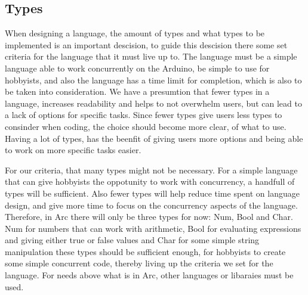 \subsection{Types}\label{sec:types}
When designing a language, the amount of types and what types to be implemented is an important descision, to guide this descision there some set criteria for the language that it must live up to. The language must be a simple language able to work concurrently on the Arduino, be simple to use for hobbyists, and also the language has a time limit for completion, which is also to be taken into consideration. We have a presumtion that fewer types in a language, increases readability and helps to not overwhelm users, but can lead to a lack of options for specific tasks. Since fewer types give users less types to consinder when coding, the choice should become more clear, of what to use. Having a lot of types, has the beenfit of giving users more options and being able to work on more specific tasks easier.


For our criteria, that many types might not be necessary. For a simple language that can give hobbyists the oppotunity to work with concurrency, a handfull of types will be sufficient. Also fewer types will help reduce time spent on language design, and give more time to focus on the concurrency aspects of the language. Therefore, in Arc there will only be three types for now: Num, Bool and Char. Num for numbers that can work with arithmetic, Bool for evaluating expressions and giving either true or false values and Char for some simple string manipulation these types should be sufficient enough, for hobbyists to create some simple concurrent code, thereby living up the criteria we set for the language. For needs above what is in Arc, other languages or libaraies must be used. 


